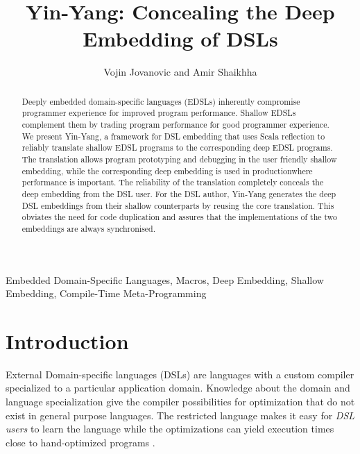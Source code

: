 \documentclass{llncs}
\begin{document}
\title{Yin-Yang: Concealing the Deep Embedding of DSLs}

\author{Vojin Jovanovic and Amir Shaikhha}


\maketitle

\begin{abstract}
Deeply embedded domain-specific languages (EDSLs) inherently compromise programmer experience for improved program performance. Shallow EDSLs complement them by trading program performance for good programmer experience. We present Yin-Yang, a framework for DSL embedding that uses Scala reflection to reliably translate shallow EDSL programs to the corresponding deep EDSL programs. The translation allows program prototyping and debugging in the user friendly shallow embedding, while the corresponding deep embedding is used in production\textemdash where performance is important. The reliability of the translation completely conceals the deep embedding from the DSL user. For the DSL author, Yin-Yang generates the deep DSL embeddings from their shallow counterparts by reusing the core translation. This obviates the need for code duplication and assures that the implementations of the two embeddings are always synchronised.
\end{abstract}

\keywords
Embedded Domain-Specific Languages, Macros, Deep Embedding, Shallow Embedding, Compile-Time Meta-Programming

\section{Introduction}

External Domain-specific languages (DSLs) are languages with a custom compiler specialized to a particular application domain. Knowledge about the domain and language specialization give the compiler possibilities for optimization that do not exist in general purpose languages. The restricted language makes it easy for \emph{DSL users} to learn the language while the optimizations can yield execution times close to hand-optimized programs \cite{rompf_optimizing_2013}.
\end{document}
